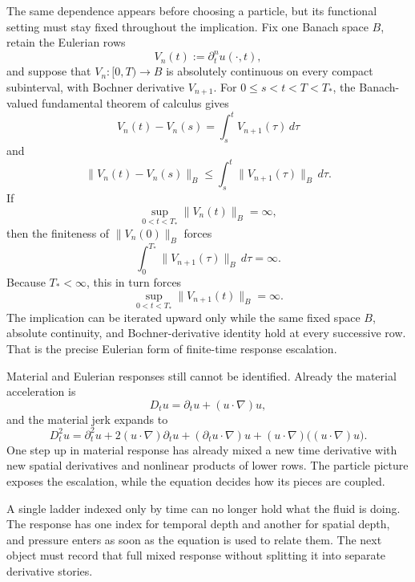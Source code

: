 The same dependence appears before choosing a particle, but its functional setting must stay fixed throughout the implication.
Fix one Banach space \(B\), retain the Eulerian rows
\[
  V_n(t):=\partial_t^n u(\cdot,t),
\]
and suppose that \(V_n:[0,T)\to B\) is absolutely continuous on every compact subinterval, with Bochner derivative \(V_{n+1}\).
For \(0\le s<t<T<T_*\), the Banach-valued fundamental theorem of calculus gives
\[
  V_n(t)-V_n(s)
  =
  \int_s^t V_{n+1}(\tau)\,d\tau
\]
and
\[
  \lVert V_n(t)-V_n(s)\rVert_B
  \le
  \int_s^t \lVert V_{n+1}(\tau)\rVert_B\,d\tau.
\]
If
\[
  \sup_{0<t<T_*}\lVert V_n(t)\rVert_B
  =
  \infty,
\]
then the finiteness of \(\lVert V_n(0)\rVert_B\) forces
\[
  \int_0^{T_*}\lVert V_{n+1}(\tau)\rVert_B\,d\tau
  =
  \infty.
\]
Because \(T_*<\infty\), this in turn forces
\[
  \sup_{0<t<T_*}\lVert V_{n+1}(t)\rVert_B
  =
  \infty.
\]
The implication can be iterated upward only while the same fixed space \(B\), absolute continuity, and Bochner-derivative identity hold at every successive row.
That is the precise Eulerian form of finite-time response escalation.

Material and Eulerian responses still cannot be identified.
Already the material acceleration is
\[
  D_tu
  =
  \partial_tu+(u\cdot\nabla)u,
\]
and the material jerk expands to
\[
  D_t^2u
  =
  \partial_t^2u
  +2(u\cdot\nabla)\partial_tu
  +(\partial_tu\cdot\nabla)u
  +(u\cdot\nabla)\bigl((u\cdot\nabla)u\bigr).
\]
One step up in material response has already mixed a new time derivative with new spatial derivatives and nonlinear products of lower rows.
The particle picture exposes the escalation, while the equation decides how its pieces are coupled.

A single ladder indexed only by time can no longer hold what the fluid is doing.
The response has one index for temporal depth and another for spatial depth, and pressure enters as soon as the equation is used to relate them.
The next object must record that full mixed response without splitting it into separate derivative stories.
